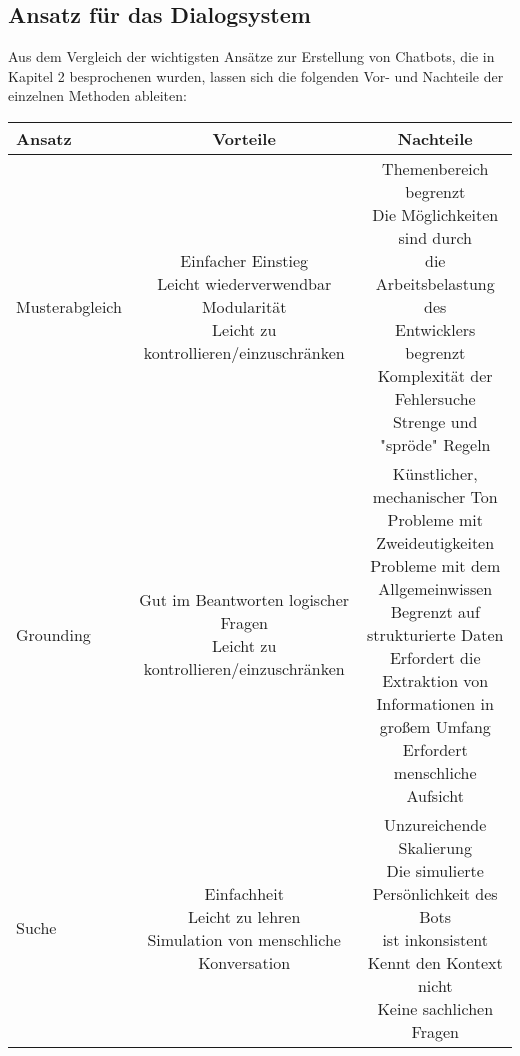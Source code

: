 \subsection{Ansatz für das Dialogsystem}
Aus dem Vergleich der wichtigsten Ansätze zur Erstellung von Chatbots, die in Kapitel 2 besprochenen wurden, lassen sich die folgenden Vor- und Nachteile der einzelnen Methoden ableiten:
\begin{table}[H]
    \centering
    \begin{tabular}{l|c|c}
        Ansatz          & Vorteile                  & Nachteile\\
        \hline
        Musterabgleich &  \makecell{Einfacher Einstieg \\ Leicht wiederverwendbar \\ Modularität \\Leicht zu kontrollieren/einzuschränken} & \makecell{Themenbereich begrenzt \\Die Möglichkeiten sind durch \\ die Arbeitsbelastung des \\ Entwicklers begrenzt \\Komplexität der Fehlersuche \\Strenge und "spröde" Regeln} \\
        \hline
        Grounding            & \makecell{Gut im Beantworten logischer Fragen \\Leicht zu kontrollieren/einzuschränken}             & \makecell{Künstlicher, mechanischer Ton \\ Probleme mit Zweideutigkeiten \\ Probleme mit dem Allgemeinwissen \\Begrenzt auf strukturierte Daten \\ Erfordert die Extraktion von \\ Informationen in großem Umfang \\ Erfordert menschliche Aufsicht}    \\
        \hline
        Suche & \makecell{Einfachheit \\ Leicht zu lehren \\ Simulation von menschliche Konversation}             & \makecell{Unzureichende Skalierung \\ Die simulierte Persönlichkeit des Bots \\ ist inkonsistent \\ Kennt den Kontext nicht \\ Keine sachlichen Fragen} \\

\end{tabular}
\end{table}
